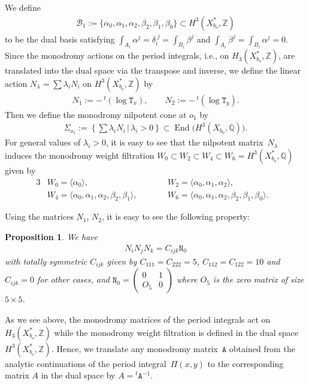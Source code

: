 \documentclass[10pt,a4paper]{amsart}
\numberwithin{equation}{section}
\newtheorem{Proposition}[Theorem]{Proposition}
\begin{document}
We define
\begin{gather}
\mathcal{B}_{1}:= \{ \alpha_{0},\alpha_{1},\alpha_{2},\beta_{2},\beta_{1},\beta_{0} \} \subset H^{3}(X_{b_{o}}^{*},\mathbb{Z})\label{eq:base-B1}
\end{gather}
to be the dual basis satisfying $\int_{A_{i}}\alpha^{j}=\delta_{i}^{\;j}=\int_{B_{i}}\beta^{j}$ and $\int_{A_{i}}\beta^{j}=\int_{B_{i}}\alpha^{j}=0$. Since the monodromy actions on the period integrals, i.e., on $H_{3}(X_{b_{o}}^{*},\mathbb{Z})$, are translated into the dual space via the transpose and inverse, we define the linear action $N_{\lambda}=\sum\lambda_{i}N_{i}$ on $H^{3}(X_{b_{o}}^{*},\mathbb{Z})$ by
\begin{gather*}
N_{1}:=-\,{}^{t}(\log\mathtt{T}_{x}),\qquad N_{2}:=-\,{}^{t}(\log\mathtt{T}_{y}).
\end{gather*}
Then we define the monodromy nilpotent cone at $o_{1}$ by
\begin{gather}
\Sigma_{o_{1}}:=\left\{ \sum\lambda_{i}N_{i}\,|\,\lambda_{i}>0\right\} \subset\operatorname{End}\big(H^{3}(X_{b_{0}},\mathbb{Q})\big).\label{eq:Cone1}
\end{gather}
For general values of $\lambda_{i}>0$, it is easy to see that the nilpotent matrix~$N_{\lambda}$ induces the monodromy weight filtration $W_{0}\subset W_{2}\subset W_{4}\subset W_{6}=H^{3}(X_{b_{o}}^{*},\mathbb{Q})$
given by
\begin{alignat}{3}
& W_{0}=\langle\alpha_{0}\rangle,\qquad && W_{2}=\langle\alpha_{0},\alpha_{1},\alpha_{2}\rangle,&\nonumber\\
& W_{4}=\langle\alpha_{0},\alpha_{1},\alpha_{2},\beta_{2},\beta_{1}\rangle,\qquad && W_{6}=\langle\alpha_{0},\alpha_{1},\alpha_{2},\beta_{2},\beta_{1},\beta_{0}\rangle.& \label{eq:W2i-filt}
\end{alignat}

Using the matrices $N_{1}$, $N_{2}$, it is easy to see the following property:
\begin{Proposition}\label{prop:Nijk-N0}We have
\begin{gather*}
N_{i}N_{j}N_{k}=C_{ijk}\mathtt{N}_{0}
\end{gather*}
with totally symmetric $C_{ijk}$ given by $C_{111}=C_{222}=5$, $C_{112}=C_{122}=10$ and $C_{ijk}=0$ for other cases, and $\mathtt{N}_{0}=\left(\begin{smallmatrix}0 & 1\\
O_{5} & 0
\end{smallmatrix}\right)$ where $O_{5}$ is the zero matrix of size $5\times5$.\end{Proposition}
\begin{Remark}\label{rem:T-and-dual-T} As we see above, the monodromy matrices of the period integrals act on $H_{3}(X_{b_{o}}^{*}{,}\mathbb{Z})$ while the monodromy weight filtration is defined in the dual space $H^{3}(X_{b_{o}}^{*},\mathbb{Z})$. Hence, we translate any monodromy matrix~$\mathtt{A}$ obtained from the analytic continuations of the period integ\-ral~$\Pi(x,y)$ to the corresponding matrix $A$ in the dual space by $A= {}^{t}\mathtt{A}^{-1}$.
\end{Remark}
\end{document}
